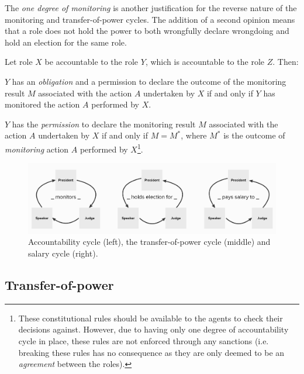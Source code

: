 The \emph{one degree of monitoring} is another justification for the reverse nature of the monitoring and transfer-of-power cycles. The addition of a second opinion means that a role does not hold the power to both wrongfully declare wrongdoing and hold an election for the same role.

Let role $X$ be accountable to the role $Y$, which is accountable to the role $Z$. Then:
\begin{rule_IIGO} \label{rule:monitoring_1}
    $Y$ has an \emph{obligation} and a {permission} to declare the outcome of the monitoring result $M$ associated with the action $A$ undertaken by $X$ if and only if $Y$ has monitored the action $A$ performed by $X$.
\end{rule_IIGO}
\begin{rule_IIGO} \label{rule:monitoring_2}
    $Y$ has the \emph{permission} to declare the monitoring result $M$ associated with the action $A$ undertaken by $X$ if and only if $M = M^{*}$, where $M^{*}$ is the outcome of \emph{monitoring} action $A$ performed by $X$\footnote{These constitutional rules should be available to the agents to check their decisions against. However, due to having only one degree of accountability cycle in place, these rules are not enforced through any sanctions (i.e. breaking these rules has no consequence as they are only deemed to be an \emph{agreement} between the roles).}.
\end{rule_IIGO}


\begin{figure}[!htb]
\centering
\includegraphics[scale=0.33]{05_iigo/images/role cycles.png}
\caption{Accountability cycle (left), the transfer-of-power cycle (middle) and salary cycle (right).}
\label{fig:cycles_in_IIGO}
\end{figure}


\subsection{Transfer-of-power}
\label{subsec:transfer-of-power}


